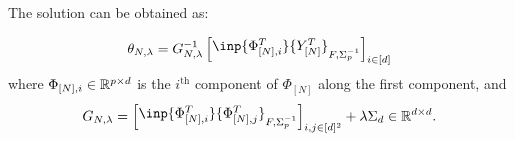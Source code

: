 \documentclass{article}
\begin{document}
The solution can be obtained as:

\begin{theorem}
\begin{equation}
    \label{eq:vector_rls}
    \theta_{N,\lambda} = G_{N, \lambda}^{-1} \begin{bmatrix}\inp{\Phi_{[N],i}^T}{Y_{[N]}^T}_{F, \Sigma_p^{-1}}\end{bmatrix}_{i\in[d]}
\end{equation}
where $\Phi_{[N],i}\in\mathbb{R}^{p\times d}$ is the $i^\text{th}$ component of $\Phi_{[N]}$ along the first component, and
\begin{equation*}
    G_{N, \lambda} = \begin{bmatrix}\inp{\Phi_{[N],i}^T}{\Phi_{[N],j}^T}_{F, \Sigma_p^{-1}}\end{bmatrix}_{i,j\in[d]^2} + \lambda \Sigma_d \in \Real^{d\times d}.
\end{equation*}
\end{theorem}
\end{document}
